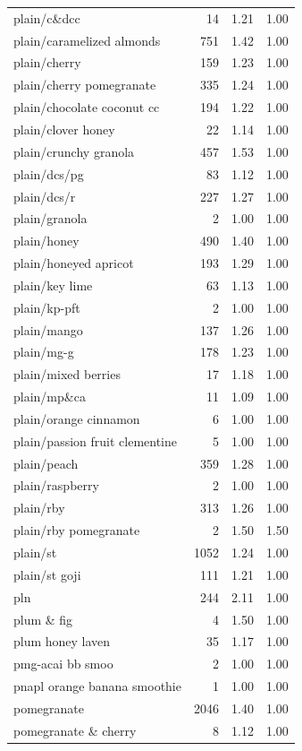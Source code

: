 \begin{table}
\begin{tabular}{lrrr}
plain/c\&dcc & 14 & 1.21 & 1.00 \\
plain/caramelized almonds & 751 & 1.42 & 1.00 \\
plain/cherry & 159 & 1.23 & 1.00 \\
plain/cherry pomegranate & 335 & 1.24 & 1.00 \\
plain/chocolate coconut cc & 194 & 1.22 & 1.00 \\
plain/clover honey & 22 & 1.14 & 1.00 \\
plain/crunchy granola & 457 & 1.53 & 1.00 \\
plain/dcs/pg & 83 & 1.12 & 1.00 \\
plain/dcs/r & 227 & 1.27 & 1.00 \\
plain/granola & 2 & 1.00 & 1.00 \\
plain/honey & 490 & 1.40 & 1.00 \\
plain/honeyed apricot & 193 & 1.29 & 1.00 \\
plain/key lime & 63 & 1.13 & 1.00 \\
plain/kp-pft & 2 & 1.00 & 1.00 \\
plain/mango & 137 & 1.26 & 1.00 \\
plain/mg-g & 178 & 1.23 & 1.00 \\
plain/mixed berries & 17 & 1.18 & 1.00 \\
plain/mp\&ca & 11 & 1.09 & 1.00 \\
plain/orange cinnamon & 6 & 1.00 & 1.00 \\
plain/passion fruit clementine & 5 & 1.00 & 1.00 \\
plain/peach & 359 & 1.28 & 1.00 \\
plain/raspberry & 2 & 1.00 & 1.00 \\
plain/rby & 313 & 1.26 & 1.00 \\
plain/rby pomegranate & 2 & 1.50 & 1.50 \\
plain/st & 1052 & 1.24 & 1.00 \\
plain/st goji & 111 & 1.21 & 1.00 \\
pln & 244 & 2.11 & 1.00 \\
plum \& fig & 4 & 1.50 & 1.00 \\
plum honey laven & 35 & 1.17 & 1.00 \\
pmg-acai bb smoo & 2 & 1.00 & 1.00 \\
pnapl orange banana smoothie & 1 & 1.00 & 1.00 \\
pomegranate & 2046 & 1.40 & 1.00 \\
pomegranate \& cherry & 8 & 1.12 & 1.00 \\

\end{tabular}
\end{table}
